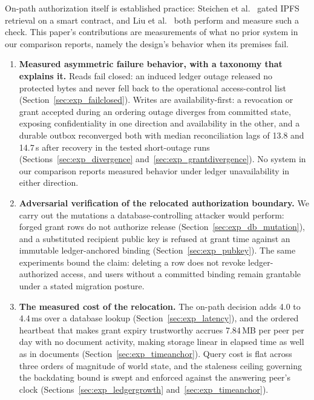 \documentclass[preprint,12pt]{elsarticle}
\begin{document}
On-path authorization itself is established practice: Steichen et
al.~\cite{steichen2018blockchain} gated IPFS retrieval on a smart contract,
and Liu et al.~\cite{liu2026rbacipfs} both perform and measure such a check.
This paper's contributions are measurements of what no prior system in our
comparison reports, namely the design's behavior when its premises fail.

\begin{enumerate}

\item \textbf{Measured asymmetric failure behavior, with a taxonomy that
explains it.} Reads fail closed: an induced ledger outage released no
protected bytes and never fell back to the operational access-control list
(Section~\ref{sec:exp_failclosed}). Writes are availability-first: a
revocation or grant accepted during an ordering outage diverges from
committed state, exposing confidentiality in one direction and availability
in the other, and a durable outbox reconverged both with median
reconciliation lags of 13.8 and 14.7\,s after recovery in the tested
short-outage runs (Sections~\ref{sec:exp_divergence}
and~\ref{sec:exp_grantdivergence}). No system in our
comparison reports measured behavior under ledger unavailability in either
direction.

\item \textbf{Adversarial verification of the relocated authorization
boundary.} We carry out the mutations a database-controlling attacker would
perform: forged grant rows do not authorize release
(Section~\ref{sec:exp_db_mutation}), and a substituted recipient public key
is refused at grant time against an immutable ledger-anchored binding
(Section~\ref{sec:exp_pubkey}). The same experiments bound the claim:
deleting a row does not revoke ledger-authorized access, and users without a
committed binding remain grantable under a stated migration posture.

\item \textbf{The measured cost of the relocation.} The on-path decision
adds 4.0 to 4.4\,ms over a database lookup
(Section~\ref{sec:exp_latency}), and the ordered heartbeat that makes grant
expiry trustworthy accrues 7.84\,MB per peer per day with no document
activity, making storage linear in elapsed time as well as in documents
(Section~\ref{sec:exp_timeanchor}). Query cost is flat across three
orders of magnitude of world state, and the staleness ceiling governing the
backdating bound is swept and enforced against the answering peer's clock
(Sections~\ref{sec:exp_ledgergrowth} and~\ref{sec:exp_timeanchor}).


\end{enumerate}
\end{document}

